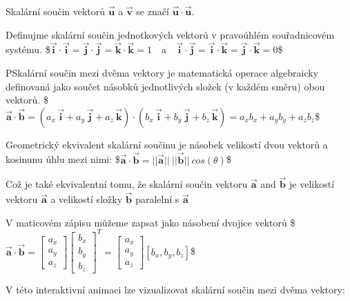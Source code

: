 \documentclass[letterpaper,10pt,english]{jupyterBook}
\begin{document}
\sphinxAtStartPar
{}
Skalární součin vektorů \(\vec{\mathbf{u}}\) a \(\vec{\mathbf{v}}\) se značí \(\vec{\mathbf{u}} \cdot \vec{\mathbf{u}}\).

\sphinxAtStartPar
Definujme skalární součin jednotkových vektorů v pravoúhlém souřadnicovém systému.
\$\( \vec{\mathbf{i}} \cdot \vec{\mathbf{i}} = \vec{\mathbf{j}} \cdot \vec{\mathbf{j}} = \vec{\mathbf{k}} \cdot \vec{\mathbf{k}}= 1 \quad \text{a} \quad \vec{\mathbf{i}} \cdot \vec{\mathbf{j}} = \vec{\mathbf{i}} \cdot \vec{\mathbf{k}} = \vec{\mathbf{j}} \cdot \vec{\mathbf{k}} = 0 \)\$

\sphinxAtStartPar
PSkalární součin mezi dvěma vektory je matematická operace algebraicky definovaná jako součet násobků jednotlivých složek (v každém směru) obou vektorů.
\$\( \overrightarrow{\mathbf{a}} \cdot \overrightarrow{\mathbf{b}} = (a_x\,\vec{\mathbf{i}}+a_y\,\vec{\mathbf{j}}+a_z\,\vec{\mathbf{k}}) \cdot (b_x\,\vec{\mathbf{i}}+b_y\,\vec{\mathbf{j}}+b_z\,\vec{\mathbf{k}}) = a_x b_x + a_y b_y + a_z b_z \)\$

\sphinxAtStartPar
Geometrický ekvivalent skalární součinu je násobek velikostí dvou vektorů a kosinunu úhlu mezi nimi:
\$\( \overrightarrow{\mathbf{a}} \cdot \overrightarrow{\mathbf{b}} = ||\overrightarrow{\mathbf{a}}||\:||\overrightarrow{\mathbf{b}}||\:cos(\theta) \)\$

\sphinxAtStartPar
Což je také ekvivalentní tomu, že skalární součin vektoru  \(\overrightarrow{\mathbf{a}}\) and \(\overrightarrow{\mathbf{b}}\) je velikostí vektoru \(\overrightarrow{\mathbf{a}}\)  a velikostí složky \(\overrightarrow{\mathbf{b}}\)  paralelní s \(\overrightarrow{\mathbf{a}}\)

\sphinxAtStartPar
V maticovém zápisu můžeme zapsat jako násobení dvojice vektorů
\$\( \overrightarrow{\mathbf{a}} \cdot \overrightarrow{\mathbf{b}} =  \begin{bmatrix} a_x \\ a_y \\ a_z \end{bmatrix}  \begin{bmatrix} b_x \\ b_y \\ b_z \end{bmatrix}^T = \begin{bmatrix} a_x \\ a_y \\ a_z \end{bmatrix} [b_x, b_y, b_z]\)\$

\sphinxAtStartPar
V této interaktivní animaci lze vizualizovat skalární součin mezi dvěma vektory:
\end{document}
